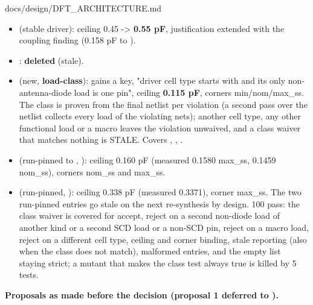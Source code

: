 \begin{relocated}{docs/design/DFT_ARCHITECTURE.md}
\begin{itemize}
\tightlist
\item
   (stable driver): ceiling 0.45
  -\textgreater{} \textbf{0.55 pF}, justification extended with the
  coupling finding (0.158 pF to ).
\item
  : \textbf{deleted} (stale).
\item
   (new, \textbf{load-class}):
   gains a  key, "driver
  cell type starts with  and its
  only non-antenna-diode load is one 
   pin", ceiling \textbf{0.115 pF}, corners
  min/\allowbreak{}nom/\allowbreak{}max\_\allowbreak{}ss. The class is
  proven from the final netlist per violation (a second pass over the
  netlist collects every load of the violating nets); another cell type,
  any other functional load or a macro leaves the violation unwaived,
  and a class waiver that matches nothing is STALE. Covers
  , , .
\item
   (run-pinned to
  , ): ceiling 0.160 pF
  (measured 0.1580 max\_ss, 0.1459 nom\_ss), corners nom\_ss and
  max\_ss.
\item
   (run-pinned, ):
  ceiling 0.338 pF (measured 0.3371), corner max\_ss. The two run-pinned
  entries go stale on the next re-synthesis by design.
   100 pass: the class waiver is
  covered for accept, reject on a second non-diode load of another kind
  or a second SCD load or a non-SCD pin, reject on a macro load, reject
  on a different cell type, ceiling and corner binding, stale reporting
  (also when the class does not match), malformed entries, and the empty
  list staying strict; a mutant that makes the class test always true is
  killed by 5 tests.
\end{itemize}

\textbf{Proposals as made before the decision (proposal 1 deferred to
).}


\end{relocated}
